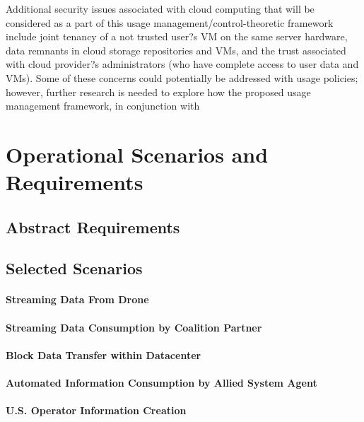 \documentclass[10pt,letterpaper]{article}
\begin{document}
Additional security issues associated with cloud computing that will be considered as a part of this usage management/control-theoretic framework include joint tenancy of a not trusted user?s VM on the same server hardware, data remnants in cloud storage repositories and VMs, and the trust associated with cloud provider?s administrators (who have complete access to user data and VMs). Some of these concerns could potentially be addressed with usage policies; however, further research is needed to explore how the proposed usage management framework, in conjunction with

\section{Operational Scenarios and Requirements}
\label{section:req-scen}

\subsection{Abstract Requirements}
\label{sec:requirements}

\subsection{Selected Scenarios}
\label{sec:scenarios}

\paragraph{Streaming Data From Drone}

\paragraph{Streaming Data Consumption by Coalition Partner}

\paragraph{Block Data Transfer within Datacenter}

\paragraph{Automated Information Consumption by Allied System Agent}

\paragraph{U.S. Operator Information Creation}
\end{document}
